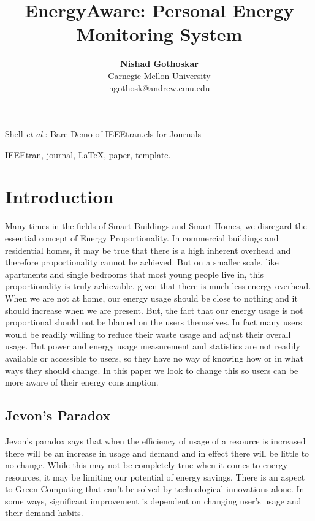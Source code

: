 \documentclass[journal]{IEEEtran}
\begin{document}
%
\title{EnergyAware: Personal Energy Monitoring System }

\author{\textbf{Nishad Gothoskar}\\Carnegie Mellon University\\ngothosk@andrew.cmu.edu}
%
{Shell \MakeLowercase{\textit{et al.}}: Bare Demo of IEEEtran.cls for Journals}
\maketitle


\begin{abstract}

\end{abstract}


\begin{IEEEkeywords}
IEEEtran, journal, \LaTeX, paper, template.
\end{IEEEkeywords}


\IEEEpeerreviewmaketitle



\section{Introduction}
Many times in the fields of Smart Buildings and Smart Homes, we disregard the essential concept of Energy Proportionality. In commercial buildings and residential homes, it may be true that there is a high inherent overhead and therefore proportionality cannot be achieved. But on a smaller scale, like apartments and single bedrooms that most young people live in, this proportionality is truly achievable, given that there is much less energy overhead. When we are not at home, our energy usage should be close to nothing and it should increase when we are present. But, the fact that our energy usage is not proportional should not be blamed on the users themselves. In fact many users would be readily willing to reduce their waste usage and adjust their overall usage. But power and energy usage measurement and statistics are not readily available or accessible to users, so they have no way of knowing how or in what ways they should change. In this paper we look to change this so users can be more aware of their energy consumption.

\subsection{Jevon's Paradox}
Jevon’s paradox says that when the efficiency of usage of a resource is increased there will be an increase in usage and demand and in effect there will be little to no change. While this may not be completely true when it comes to energy resources, it may be limiting our potential of energy savings. There is an aspect to Green Computing that can’t be solved by technological innovations alone. In some ways, significant improvement is dependent on changing user's usage and  their demand habits. 
\end{document}
